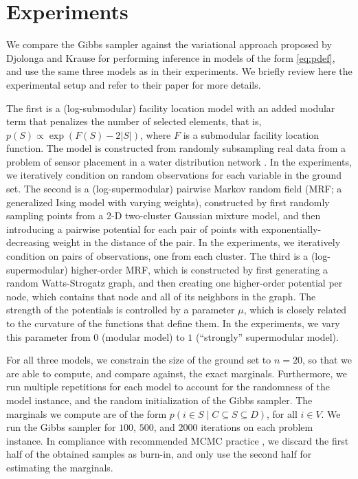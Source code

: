 \section{Experiments}
We compare the Gibbs sampler against the variational approach proposed by Djolonga and Krause \cite{djolonga14} for performing inference in models of the form \eqref{eq:pdef}, and use the same three models as in their experiments.
We briefly review here the experimental setup and refer to their paper for more details.

The first is a (log-submodular) facility location model with an added modular term that penalizes the number of selected elements, that is, $p(S) \propto \exp(F(S)-2|S|)$, where $F$ is a submodular facility location function.
The model is constructed from randomly subsampling real data from a problem of sensor placement in a water distribution network \cite{krause08}.
In the experiments, we iteratively condition on random observations for each variable in the ground set.
The second is a (log-supermodular) pairwise Markov random field (MRF; a generalized Ising model with varying weights), constructed by first randomly sampling points from a 2-D two-cluster Gaussian mixture model, and then introducing a pairwise potential for each pair of points with exponentially-decreasing weight in the distance of the pair.
In the experiments, we iteratively condition on pairs of observations, one from each cluster.
The third is a (log-supermodular) higher-order MRF, which is constructed by first generating a random Watts-Strogatz graph, and then creating one higher-order potential per node, which contains that node and all of its neighbors in the graph.
The strength of the potentials is controlled by a parameter $\mu$, which is closely related to the curvature of the functions that define them.
In the experiments, we vary this parameter from $0$ (modular model) to $1$ (``strongly'' supermodular model).

For all three models, we constrain the size of the ground set to $n = 20$, so that we are able to compute, and compare against, the exact marginals.
Furthermore, we run multiple repetitions for each model to account for the randomness of the model instance, and the random initialization of the Gibbs sampler.
The marginals we compute are of the form $p(i \in S \mid C \subseteq S \subseteq D)$, for all $i \in V$.
We run the Gibbs sampler for $100$, $500$, and $2000$ iterations on each problem instance.
In compliance with recommended MCMC practice \cite{gelman11}, we discard the first half of the obtained samples as burn-in, and only use the second half for estimating the marginals.

